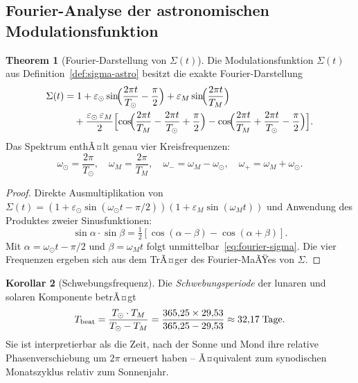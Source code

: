 ﻿\documentclass[12pt, a4paper]{article}
\theoremstyle{definition}
\newtheorem{theorem}{Theorem}[section]
\newtheorem{korollar}[theorem]{Korollar}
\begin{document}
\subsection{Fourier-Analyse der astronomischen Modulationsfunktion}

\begin{theorem}[Fourier-Darstellung von $\Sigma(t)$]\label{thm:fourier-sigma}
Die Modulationsfunktion $\Sigma(t)$ aus Definition~\ref{def:sigma-astro} besitzt
die exakte Fourier-Darstellung
\begin{equation}\label{eq:fourier-sigma}
\begin{aligned}
  \Sigma(t) &= 1
    + \varepsilon_{\odot}\sin\!\Bigl(\frac{2\pi t}{T_{\odot}} - \frac{\pi}{2}\Bigr)
    + \varepsilon_M \sin\!\Bigl(\frac{2\pi t}{T_M}\Bigr) \\
    &\quad + \frac{\varepsilon_{\odot}\,\varepsilon_M}{2}
      \Bigl[
        \cos\!\Bigl(\frac{2\pi t}{T_M} - \frac{2\pi t}{T_{\odot}} + \frac{\pi}{2}\Bigr)
        - \cos\!\Bigl(\frac{2\pi t}{T_M} + \frac{2\pi t}{T_{\odot}} - \frac{\pi}{2}\Bigr)
      \Bigr].
\end{aligned}
\end{equation}
Das Spektrum enthÃ¤lt genau vier Kreisfrequenzen:
\[
  \omega_{\odot} = \frac{2\pi}{T_{\odot}},\quad
  \omega_M = \frac{2\pi}{T_M},\quad
  \omega_- = \omega_M - \omega_{\odot},\quad
  \omega_+ = \omega_M + \omega_{\odot}.
\]
\end{theorem}

\begin{proof}
Direkte Ausmultiplikation von
$\Sigma(t) = (1 + \varepsilon_{\odot}\sin(\omega_{\odot}t - \pi/2))(1 + \varepsilon_M\sin(\omega_M t))$
und Anwendung des Produktes zweier Sinusfunktionen:
\[
  \sin\alpha\cdot\sin\beta = \tfrac{1}{2}[\cos(\alpha-\beta) - \cos(\alpha+\beta)].
\]
Mit $\alpha = \omega_{\odot}t - \pi/2$ und $\beta = \omega_M t$ folgt
unmittelbar~\eqref{eq:fourier-sigma}. Die vier Frequenzen ergeben sich aus dem
TrÃ¤ger des Fourier-MaÃŸes von $\Sigma$. \hfill
\end{proof}

\begin{korollar}[Schwebungsfrequenz]\label{cor:schwebung}
Die \emph{Schwebungsperiode} der lunaren und solaren Komponente betrÃ¤gt
\begin{equation}\label{eq:schwebung}
  T_{\rm beat} = \frac{T_{\odot}\cdot T_M}{T_{\odot} - T_M}
  = \frac{365{,}25 \times 29{,}53}{365{,}25 - 29{,}53}
  \approx 32{,}17\;\text{Tage}.
\end{equation}
Sie ist interpretierbar als die Zeit, nach der Sonne und Mond ihre relative
Phasenverschiebung um $2\pi$ erneuert haben -- Ã¤quivalent zum synodischen
Monatszyklus relativ zum Sonnenjahr.
\end{korollar}
\end{document}
